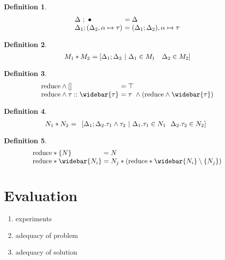 \documentclass[manuscript]{acmart}
\theoremstyle{definition}
\newtheorem{definition}{Definition}[section]
\begin{document}
\begin{definition}
\[
  \begin{array}{l @{} l}
  \Delta\ ;\ \bullet
  &\ = \Delta 
  \\
  \Delta_1;(\Delta_2,\alpha \mapsto \tau) 
  &\ = (\Delta_1;\Delta_2),\alpha \mapsto \tau
  \end{array}
\]
\end{definition}

\begin{definition}
\[
  \begin{array}{l @{} l}
  M_1 * M_2 
  &\ = 
  [\Delta_1 ; \Delta_2 \ |\ 
    \Delta_1 \in M_1
    \ \ \  
    \Delta_2 \in M_2
  ]
  \end{array}
\]
\end{definition}

\begin{definition}
\[
  \begin{array}{l @{} l}
  \text{reduce} \wedge [] 
  &\ = \top
  \\
  \text{reduce} \wedge \tau::\widebar{\tau}
  &\ = \tau\ \wedge (\text{reduce} \wedge \widebar{\tau})
  \end{array}
\]
\end{definition}

\begin{definition}
\[
  \begin{array}{l @{} l}
    N_1 * N_2
    &\ = 
    \begin{array}[t]{l}
      [ \Delta_1 ; \Delta_2 . \tau_1 \wedge \tau_2 \ |\ 
        \Delta_1.\tau_1 \in N_1
        \ \ 
        \Delta_2.\tau_2 \in N_2
      ]
    \end{array}
  \end{array}
\]
\end{definition}

\begin{definition}
\[
  \begin{array}{l @{}l}
  \text{reduce} * \{N\}
  & {}= N
  \\
  \text{reduce} * \widebar{N_i}
  & {}= N_j * (\text{reduce} * \widebar{N_i}\setminus\{N_j\})
  \end{array}
\]
\end{definition}

\section{Evaluation}
\begin{enumerate}
  \item experiments 
  \item adequacy of problem 
  \item adequacy of solution 
\end{enumerate}
\end{document}
